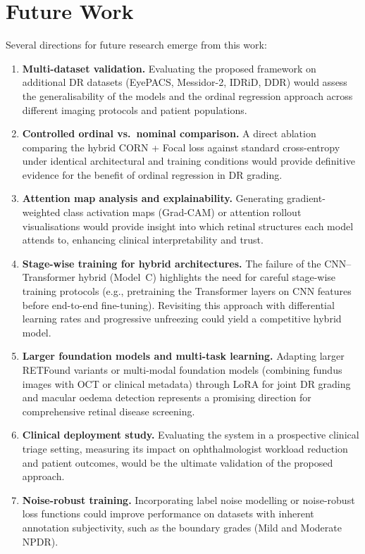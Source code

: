 \section{Future Work}
\label{sec:future_work}

Several directions for future research emerge from this work:

\begin{enumerate}
    \item \textbf{Multi-dataset validation.} Evaluating the proposed framework on additional DR datasets (EyePACS, Messidor-2, IDRiD, DDR) would assess the generalisability of the models and the ordinal regression approach across different imaging protocols and patient populations.
    
    \item \textbf{Controlled ordinal vs.\ nominal comparison.} A direct ablation comparing the hybrid CORN + Focal loss against standard cross-entropy under identical architectural and training conditions would provide definitive evidence for the benefit of ordinal regression in DR grading.
    
    \item \textbf{Attention map analysis and explainability.} Generating gradient-weighted class activation maps (Grad-CAM) or attention rollout visualisations would provide insight into which retinal structures each model attends to, enhancing clinical interpretability and trust.
    
    \item \textbf{Stage-wise training for hybrid architectures.} The failure of the CNN--Transformer hybrid (Model~C) highlights the need for careful stage-wise training protocols (e.g., pretraining the Transformer layers on CNN features before end-to-end fine-tuning). Revisiting this approach with differential learning rates and progressive unfreezing could yield a competitive hybrid model.
    
    \item \textbf{Larger foundation models and multi-task learning.} Adapting larger RETFound variants or multi-modal foundation models (combining fundus images with OCT or clinical metadata) through LoRA for joint DR grading and macular oedema detection represents a promising direction for comprehensive retinal disease screening.
    
    \item \textbf{Clinical deployment study.} Evaluating the system in a prospective clinical triage setting, measuring its impact on ophthalmologist workload reduction and patient outcomes, would be the ultimate validation of the proposed approach.
    
    \item \textbf{Noise-robust training.} Incorporating label noise modelling or noise-robust loss functions could improve performance on datasets with inherent annotation subjectivity, such as the boundary grades (Mild and Moderate NPDR).
\end{enumerate}


